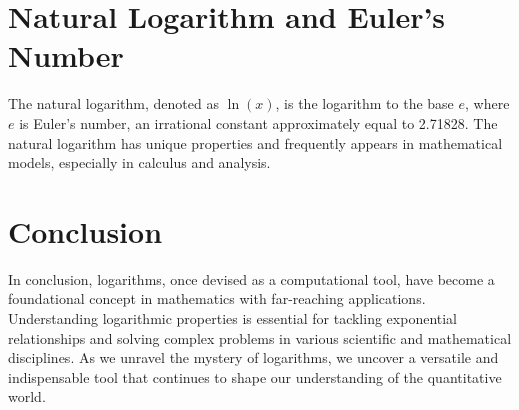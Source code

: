 \documentclass{article}
\begin{document}
\section*{Natural Logarithm and Euler's Number}
The natural logarithm, denoted as $\ln(x)$, is the logarithm to the base $e$, where $e$ is Euler's number, an irrational constant approximately equal to 2.71828. The natural logarithm has unique properties and frequently appears in mathematical models, especially in calculus and analysis.

\section*{Conclusion}
In conclusion, logarithms, once devised as a computational tool, have become a foundational concept in mathematics with far-reaching applications. Understanding logarithmic properties is essential for tackling exponential relationships and solving complex problems in various scientific and mathematical disciplines. As we unravel the mystery of logarithms, we uncover a versatile and indispensable tool that continues to shape our understanding of the quantitative world.
\end{document}
